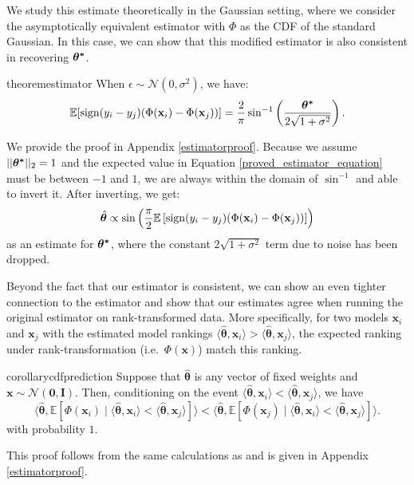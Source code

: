 \documentclass{article} %
\begin{document}
We study this estimate theoretically in the Gaussian setting, where we consider the asymptotically equivalent estimator with $\Phi$ as the CDF of the standard Gaussian. In this case, we can show that this modified estimator is also consistent in recovering $\bm{{\bf{\theta}^*}}$.
\begin{restatable}{theorem}{estimator}
\label{estimator_theorem}
When $\epsilon \sim \mathcal{N}(0,\sigma^2)$, we have:
\begin{equation}
\label{proved_estimator_equation}
\mathbb{E}[\operatorname{sign}(y_i - y_j) (\Phi(\mathbf{x}_i) - \Phi(\mathbf{x}_j))] = \frac{2}{\pi}\sin^{-1}\left(\frac{\bm{{\bf{\theta}^*}}}{2\sqrt{1+\sigma^2}}\right).
\end{equation}
\end{restatable}
We provide the proof in Appendix \ref{estimatorproof}. Because we assume $||\bm{{\bf{\theta}^*}}||_2=1$ and the expected value in Equation \ref{proved_estimator_equation} must be between $-1$ and $1$, we are always within the domain of $\sin^{-1}$ and able to invert it. After inverting, we get:
\begin{equation}
\label{estimator}
\hat{\bm{\theta}} \propto \sin\left(\frac{\pi}{2} \mathbb{E}\left[\operatorname{sign}(y_i - y_j)(\Phi(\mathbf{x}_i) - \Phi(\mathbf{x}_j))\right]\right)
\end{equation}
as an estimate for $\bm{{\bf{\theta}^*}}$, where the constant $2\sqrt{1+\sigma^2}$ term due to noise has been dropped.

Beyond the fact that our estimator is consistent, we can show an even tighter connection to the \citeauthor{chen2017robust} estimator and show that our estimates agree when running the original estimator on rank-transformed data. More specifically, for two models $\mathbf{x}_i$ and $\mathbf{x}_j$ with the estimated model rankings $\langle \hat{\bm{\theta}}, \mathbf{x}_i\rangle > \langle \hat{\bm{\theta}}, \mathbf{x}_j \rangle$, the expected ranking under rank-transformation (i.e.\ $\Phi(\mathbf{x})$) match this ranking. 

\begin{restatable}{corollary}{cdfprediction} Suppose that $\hat{\bm{\theta}}$ is any vector of fixed weights and $\mathbf{x} \sim \mathcal{N}(\mathbf{0},\mathbf{I})$. Then, conditioning on the event $\langle\hat{\bm{\theta}},\mathbf{x}_i\rangle < \langle\hat{\bm{\theta}},\mathbf{x}_j\rangle$, we have
\begin{equation}
\label{predicting}
\langle\hat{\bm{\theta}},\mathbb{E}[\Phi(\mathbf{x}_i)\mid \langle\hat{\bm{\theta}},\mathbf{x}_i\rangle < \langle\hat{\bm{\theta}},\mathbf{x}_j\rangle]\rangle < 
\langle\hat{\bm{\theta}},\mathbb{E}[\Phi(\mathbf{x}_j)\mid\langle\hat{\bm{\theta}},\mathbf{x}_i\rangle < \langle\hat{\bm{\theta}},\mathbf{x}_j\rangle]\rangle.
\end{equation}
with probability $1$.
\end{restatable}
This proof follows from the same calculations as  and is given in Appendix \ref{estimatorproof}.
\end{document}
